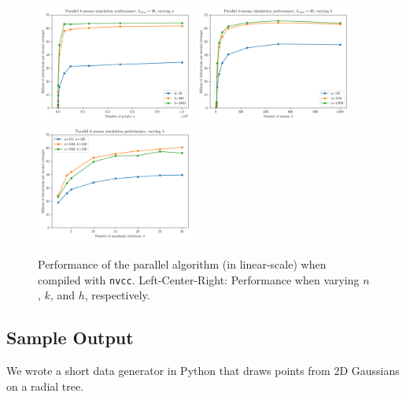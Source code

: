 \documentclass{article}
\begin{document}
	\begin{figure}[H]
		\begin{center}
			\includegraphics[width=5.2cm]{figures/perf_plot1_lin.png}\quad
			\includegraphics[width=5.2cm]{figures/perf_plot2_lin.png}\quad
			\includegraphics[width=5.2cm]{figures/perf_plot3_lin.png}
		\end{center}
		\caption{Performance of the parallel algorithm (in linear-scale) when compiled with \texttt{nvcc}. Left-Center-Right: Performance when varying $n$, $k$, and $h$, respectively.}
	\end{figure}
	
	\clearpage\subsection*{Sample Output}
	
	We wrote a short data generator in Python that draws points from 2D Gaussians on a radial tree.
	
\end{document}
